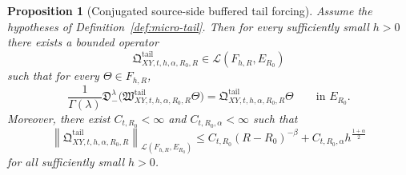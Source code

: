 \documentclass[11pt,a4paper]{amsart}
\theoremstyle{plain}
\newtheorem{proposition}[theorem]{Proposition}
\theoremstyle{definition}
\theoremstyle{remark}
\begin{document}
\begin{proposition}[Conjugated source-side buffered tail forcing]
\label{prop:micro-tail-XY}
Assume the hypotheses of Definition~\ref{def:micro-tail}. Then for every sufficiently small \(h>0\)
there exists a bounded operator
\[
\mathfrak Q_{XY,t,h,\alpha,R_0,R}^{\mathrm{tail}}
\in \mathcal L(F_{h,R},E_{R_0})
\]
such that for every \(\Theta\in F_{h,R}\),
\begin{equation}\label{eq:micro-tail-XY-conj}
\frac{1}{\Gamma(\lambda)}
\mathfrak D_-^\lambda
\bigl(
\mathfrak W_{XY,t,h,\alpha,R_0,R}^{\mathrm{tail}}\Theta
\bigr)
=
\mathfrak Q_{XY,t,h,\alpha,R_0,R}^{\mathrm{tail}}\Theta
\qquad\text{in }E_{R_0}.
\end{equation}
Moreover, there exist \(C_{t,R_0}<\infty\) and \(C_{t,R_0,\alpha}<\infty\) such that
\begin{equation}\label{eq:micro-tail-XY-bound}
\left\|
\mathfrak Q_{XY,t,h,\alpha,R_0,R}^{\mathrm{tail}}
\right\|_{\mathcal L(F_{h,R},E_{R_0})}
\le
C_{t,R_0}(R-R_0)^{-\beta}
+C_{t,R_0,\alpha}h^{\frac{1+\alpha}{2}}
\end{equation}
for all sufficiently small \(h>0\).
\end{proposition}
\end{document}
